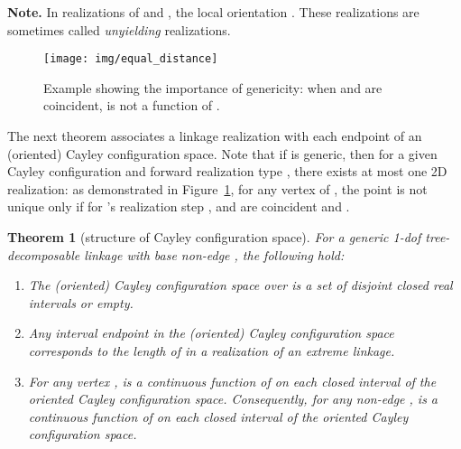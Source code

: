 \documentclass[secthm,amsthm,english]{article}
\newtheorem{theorem}{Theorem}
\theoremstyle{definition}
\theoremstyle{remark}
\begin{document}
\noindent\textbf{Note.} In realizations of 
and , the local orientation .
These realizations are sometimes called \emph{unyielding} realizations. 




\begin{figure}[h]
	  
	  
	  
	
	\begin{centering}
	\texttt{[image: img/equal\_distance]}
	\par\end{centering}
	
	\caption{Example showing the importance of genericity: when  and  are coincident, 
	is not a function of .}
	
	\label{F:equal-distance} 
\end{figure}





The next theorem associates a linkage realization with each endpoint of an (oriented) Cayley configuration space. Note that if  is generic, then for a given Cayley configuration  and forward realization type , there exists at most one 2D realization:  
as demonstrated in Figure~\ref{F:equal-distance}, 
for any vertex  of , the point  is not unique only if for 's realization step ,
 and  are coincident and .

\begin{theorem}[structure of Cayley configuration space]\label{lem:algebraic}
 For a generic 1-dof tree-decomposable linkage  with base non-edge , 
the following hold:

 \begin{enumerate}
 	\item The (oriented) Cayley configuration space over  is a set of disjoint closed real intervals or empty. 
 	
 	\item Any interval endpoint in the (oriented) Cayley configuration space corresponds to the length of  in a realization of an extreme linkage. 
 	\item For any vertex ,  is a continuous
 	 	function of  on each closed interval of the oriented Cayley configuration space.
Consequently, for any  non-edge ,  is a continuous function of  on each closed interval of the oriented Cayley configuration space.\end{enumerate}
 
\end{theorem}
\end{document}
